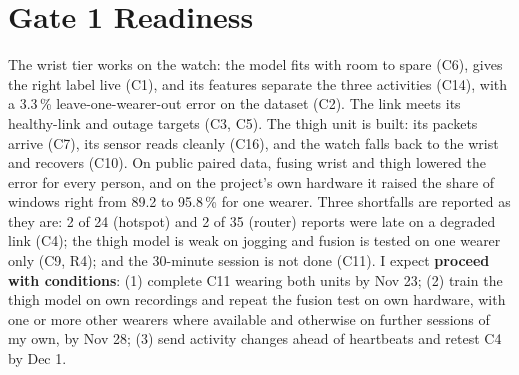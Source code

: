 \documentclass[conference]{IEEEtran}
\begin{document}
\FloatBarrier
\section{Gate 1 Readiness}
\label{sec:readiness}

The wrist tier works on the watch: the model fits with room to spare
(C6), gives the right label live (C1), and its features separate the
three activities (C14), with a 3.3\,\% leave-one-wearer-out error on
the dataset (C2). The link meets its healthy-link and outage targets
(C3, C5). The thigh unit is built: its packets arrive (C7), its sensor
reads cleanly (C16), and the watch falls back to the wrist and recovers
(C10). On public paired data, fusing wrist and thigh lowered the error
for every person, and on the project's own hardware it raised the share
of windows right from 89.2 to 95.8\,\% for one wearer. Three shortfalls
are reported as they are: 2 of 24 (hotspot) and 2 of 35 (router) reports were late on a degraded link
(C4); the
thigh model is weak on jogging and fusion is tested on one wearer only
(C9, R4); and the 30-minute session is not done (C11). I expect
\textbf{proceed with conditions}: (1) complete C11 wearing both units by
Nov 23; (2) train the thigh model on own recordings and repeat the
fusion test on own hardware, with one or more other wearers where
available and otherwise on further sessions of my own, by Nov 28; (3) send activity changes ahead
of heartbeats and retest C4 by Dec 1.

\vspace{2pt}
\end{document}
